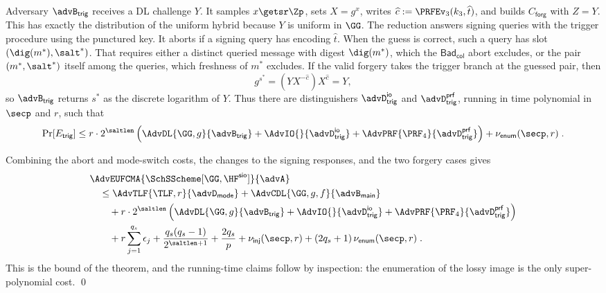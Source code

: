 Adversary $\advB_{\mathsf{trig}}$ receives a DL challenge $Y$. It samples $x\getsr\Zp$, sets $X=g^x$, writes $\widehat c:=\PRFEv_3(k_3,\widehat t)$, and builds $C_{\mathsf{forg}}$ with $Z=Y$. This has exactly the distribution of the uniform hybrid because $Y$ is uniform in $\GG$. The reduction answers signing queries with the trigger procedure using the punctured key. It aborts if a signing query has encoding $\widehat t$. When the guess is correct, such a query has slot $(\dig(m^*),\salt^*)$. That requires either a distinct queried message with digest $\dig(m^*)$, which the $\mathsf{Bad}_{\mathsf{col}}$ abort excludes, or the pair $(m^*,\salt^*)$ itself among the queries, which freshness of $m^*$ excludes. If the valid forgery takes the trigger branch at the guessed pair, then
$$
g^{s^*}=(YX^{-\widehat c})X^{\widehat c}=Y,
$$
so $\advB_{\mathsf{trig}}$ returns $s^*$ as the discrete logarithm of $Y$. Thus there are distinguishers $\advD_{\mathsf{trig}}^{\mathsf{io}}$ and $\advD_{\mathsf{trig}}^{\mathsf{prf}}$, running in time polynomial in $\secp$ and $r$, such that
$$
\Pr[E_{\mathsf{trig}}]
\le
r\cdot2^{\saltlen}\left(
\AdvDL{\GG,g}{\advB_{\mathsf{trig}}}
+\AdvIO{}{\advD_{\mathsf{trig}}^{\mathsf{io}}}
+\AdvPRF{\PRF_4}{\advD_{\mathsf{trig}}^{\mathsf{prf}}}
\right)+\nu_{\mathsf{enum}}(\secp,r) \;.
$$

 Combining the abort and mode-switch costs, the changes to the signing responses, and the two forgery cases gives
$$
\begin{aligned}
&\AdvEUFCMA{\SchSScheme[\GG,\HF^{\mathsf{sio}}]}{\advA}\\
&\quad\le
\AdvTLF{\TLF,r}{\advD_{\mathsf{mode}}}
+\AdvCDL{\GG,g,f}{\advB_{\mathsf{main}}}\\
&\qquad+r\cdot2^{\saltlen}\left(
\AdvDL{\GG,g}{\advB_{\mathsf{trig}}}
+\AdvIO{}{\advD_{\mathsf{trig}}^{\mathsf{io}}}
+\AdvPRF{\PRF_4}{\advD_{\mathsf{trig}}^{\mathsf{prf}}}
\right)\\
&\qquad+r\sum_{j=1}^{q_s}\epsilon_j
+\frac{q_s(q_s-1)}{2^{\saltlen+1}}
+\frac{2q_s}{p}
+\nu_{\mathsf{inj}}(\secp,r)
+(2q_s+1)\,\nu_{\mathsf{enum}}(\secp,r) \;.
\end{aligned}
$$
This is the bound of the theorem, and the running-time claims follow by inspection: the enumeration of the lossy image is the only super-polynomial cost. \qed

